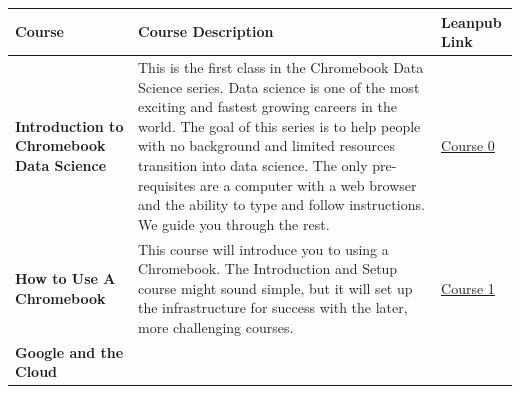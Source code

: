 \documentclass[]{book}
\begin{document}
\begin{longtable}[]{@{}lll@{}}
\toprule
\begin{minipage}[b]{0.26\columnwidth}\raggedright
Course\strut
\end{minipage} & \begin{minipage}[b]{0.54\columnwidth}\raggedright
Course Description\strut
\end{minipage} & \begin{minipage}[b]{0.12\columnwidth}\raggedright
Leanpub Link\strut
\end{minipage}\tabularnewline
\midrule
\endhead
\begin{minipage}[t]{0.26\columnwidth}\raggedright
\textbf{Introduction to Chromebook Data Science}\strut
\end{minipage} & \begin{minipage}[t]{0.54\columnwidth}\raggedright
This is the first class in the Chromebook Data Science series. Data science is one of the most exciting and fastest growing careers in the world. The goal of this series is to help people with no background and limited resources transition into data science. The only pre-requisites are a computer with a web browser and the ability to type and follow instructions. We guide you through the rest.\strut
\end{minipage} & \begin{minipage}[t]{0.12\columnwidth}\raggedright
\href{https://leanpub.com/universities/courses/jhu/cbds-intro}{Course 0}\strut
\end{minipage}\tabularnewline
\begin{minipage}[t]{0.26\columnwidth}\raggedright
\textbf{How to Use A Chromebook}\strut
\end{minipage} & \begin{minipage}[t]{0.54\columnwidth}\raggedright
This course will introduce you to using a Chromebook. The Introduction and Setup course might sound simple, but it will set up the infrastructure for success with the later, more challenging courses.\strut
\end{minipage} & \begin{minipage}[t]{0.12\columnwidth}\raggedright
\href{https://leanpub.com/universities/courses/jhu/cbds-chromebook}{Course 1}\strut
\end{minipage}\tabularnewline
\begin{minipage}[t]{0.26\columnwidth}\raggedright
\textbf{Google and the Cloud}\strut
\end{minipage} & \begin{minipage}[t]{0.54\columnwidth}\raggedright

\end{minipage}
\end{longtable}
\end{document}
